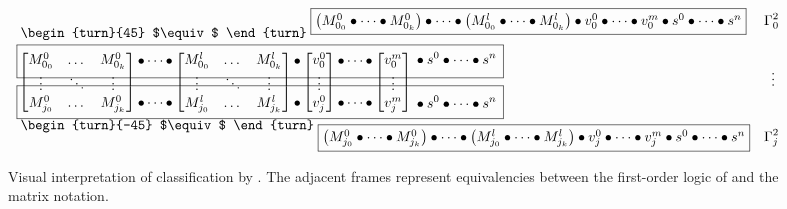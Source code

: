 \begingroup
\begin{figure}[ht]
  \def\classmatraise#1{%
    \begin{aligned}
    #1 \\ {} \\ #1
    \end{aligned}
  }
  \def\classmateq{%
    \matseqsup{0}
      \classmatraise{\monoidop\cdots\monoidop}
    \matseqsup{l}
      \classmatraise\monoidop
    \vecseqsup{0}
      \classmatraise{\monoidop\cdots\monoidop}
    \vecseqsup{m}
      \classmatraise{%
        {}\monoidop s^0\monoidop\cdots\monoidop s^n%
      }
  }

  \begin{align*}
    &\;\raisebox{-3mm}[0mm]{%
       \begin{turn}{45}
         $\equiv$
       \end{turn}%
     } \;\fbox{$
        \left(M^0_{0_0} \monoidops M^0_{0_k}\right)
        \monoidops
        \left(M^l_{0_0} \monoidops M^l_{0_k}\right)
        \monoidop
        v^0_0 \monoidops v^m_0
        \monoidop
        s^0 \monoidops s^n
      $} &\Gamma^2_0 \\[-2mm]
    &\fbox{\raisebox{0mm}[0mm][6mm]{\hphantom{$\classmateq$}}} \\[-8mm]
    &\classmateq &\vdots\; \\[-10mm]
    &\fbox{\raisebox{0mm}[0mm][6mm]{\hphantom{$\classmateq$}}} \\
    &\;\raisebox{3mm}[0mm]{%
       \begin{turn}{-45}
         $\equiv$
       \end{turn}%
     } \;\fbox{$
        \left(M^0_{j_0} \monoidops M^0_{j_k}\right)
        \monoidops
        \left(M^l_{j_0} \monoidops M^l_{j_k}\right)
        \monoidop
        v^0_j \monoidops v^m_j
        \monoidop
        s^0 \monoidops s^n
      $} &\Gamma^2_j
  \end{align*}
\caption{Visual interpretation of classification by .
         The adjacent frames represent equivalencies between the first-order
           logic of  and the matrix notation.}
\label{f:class-mat-boxes}
\end{figure}
\endgroup

